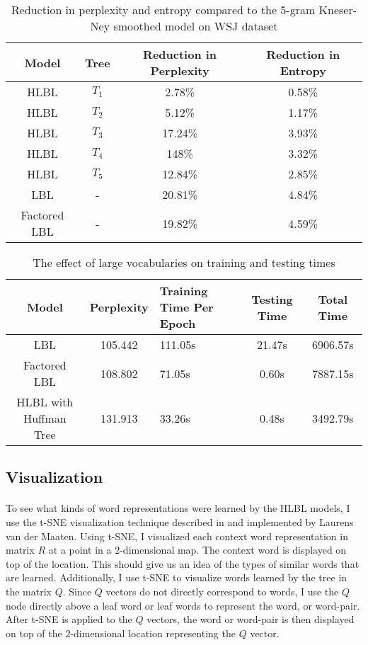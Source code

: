\documentclass[12pt]{ociamthesis}  %
\newcommand{\ra}[1]{\renewcommand{\arraystretch}{#1}}
\begin{document}
\begin{table*} \centering
\ra{1.3}
\begin{tabular}{@{}cccc@{}}\toprule
Model & Tree & Reduction in Perplexity & Reduction in Entropy\\ 
\midrule
 HLBL & $T_1$ &2.78\% & 0.58\%\\
 HLBL & $T_2$ &5.12\% & 1.17\%\\
 HLBL & $T_3$ &17.24\% & 3.93\% \\
 HLBL & $T_4$ &148\% & 3.32\%\\
 HLBL & $T_5$ &12.84\% & 2.85\%\\
 LBL& - & 20.81\% &4.84\% \\
 Factored LBL & - &19.82\%&4.59\%\\
\bottomrule
\end{tabular}
\caption{Reduction in perplexity and entropy compared to the 5-gram Kneser-Ney smoothed model on WSJ dataset}
\label{tab:reductionPerplexity}
\end{table*}

\begin{table*} \centering
\ra{1.3}
\begin{tabular}{@{}ccC{2cm}cc@{}}\toprule
Model & Perplexity & Training Time Per Epoch & Testing Time & Total Time\\ 
\midrule
 LBL&105.442 &111.05s & 21.47s & 6906.57s \\
 Factored LBL &108.802& 71.05s & 0.60s & 7887.15s\\
 HLBL with Huffman Tree &131.913& 33.26s &0.48s &3492.79s \\
\bottomrule
\end{tabular}
\caption{The effect of large vocabularies on training and testing times}
\label{tab:largeVocabulary}
\end{table*}

\subsection{Visualization}
\paragraph{}
To see what kinds of word representations were learned by the HLBL models, I use the t-SNE visualization technique described in \cite{Maaten2008} and implemented by Laurens van der Maaten. Using t-SNE, I visualized each context word representation in matrix $R$ at a point in a $2$-dimensional map. The context word is displayed on top of the location. This should give us an idea of the types of similar words that are learned. Additionally, I use t-SNE to visualize words learned by the tree in the matrix $Q$. Since $Q$ vectors do not directly correspond to words, I use the $Q$ node directly above a leaf word or leaf words to represent the word, or word-pair. After t-SNE is applied to the $Q$ vectors, the word or word-pair is then displayed on top of the $2$-dimensional location representing the $Q$ vector.
\end{document}
